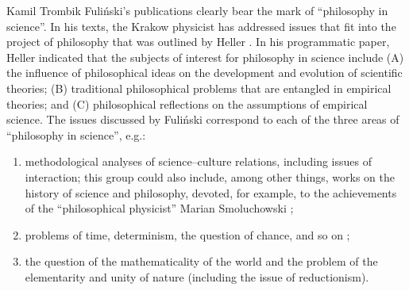 \begin{artengenv}{Kamil Trombik}
Fuliński's publications clearly bear the mark of ``philosophy in science''. In his texts, the Krakow physicist has addressed issues that fit into the project of philosophy that was outlined by Heller 
\parencites*[][]{heller_jak_1986}[English translation:][]{heller_how_2019}. %
 In his programmatic paper, Heller indicated that the subjects of interest for philosophy in science include (A) the influence of philosophical ideas on the development and evolution of scientific theories; (B) traditional philosophical problems that are entangled in empirical theories; and (C) philosophical reflections on the assumptions of empirical science. The issues discussed by Fuliński correspond to each of the three areas of ``philosophy in science'', e.g.:


\begin{enumerate}[label=(\Alph*):]
\item methodological analyses of science–culture relations, including issues of interaction; this group could also include, among other things, works on the history of science and philosophy, devoted, for example, to the achievements of the ``philosophical physicist'' Marian Smoluchowski 
\parencite[e.g.,][]{fulinski_fluktuujacy_2017};%

\item problems of time, determinism, the question of chance, and so on 
\parencites[e.g.,][]{fulinski_o_1993}[][]{fulinski_profesor_2015};%

\item the question of the mathematicality of the world and the problem of the elementarity and unity of nature (including the issue of reductionism).
\end{enumerate}





\end{artengenv}

